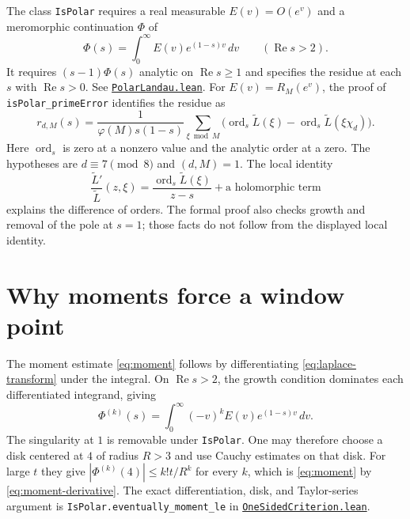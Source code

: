 \documentclass[11pt,oneside,openany]{amsbook}
\theoremstyle{remark}
\numberwithin{equation}{section}
\newcommand{\re}{\operatorname{Re}}
\newcommand{\ghroot}{https://github.com/lsernau/grh-lean/blob/}
\newcommand{\ghrev}{72fead102f663d5c7a407964a13dc0cf9d977207}
\newcommand{\leanfile}[2]{%
  \href{\ghroot\ghrev/grh-compact/src/#1}{\nolinkurl{#2}}}
\begin{document}
The class \texttt{IsPolar} requires a real measurable
$E(v)=O(e^v)$ and a meromorphic continuation $\Phi$ of
\begin{equation}
\label{eq:laplace-transform}
\Phi(s)=\int_0^\infty E(v)e^{(1-s)v}\,dv
\qquad(\re s>2).
\end{equation}
It requires $(s-1)\Phi(s)$ analytic on $\re s\ge1$ and
specifies the residue at each $s$ with $\re s>0$.
See \leanfile{Lib/Analytic/Landau/PolarLandau.lean}%
{PolarLandau.lean}. For $E(v)=R_M(e^v)$, the proof of
\texttt{isPolar\_primeError} identifies the residue as
\begin{equation}
\label{eq:polar-residue}
r_{d,M}(s)=\frac{1}{\varphi(M)s(1-s)}
\sum_{\xi\bmod M}
\bigl(\operatorname{ord}_s\widetilde L(\xi)
  -\operatorname{ord}_s\widetilde L(\xi\chi_d)\bigr).
\end{equation}
Here $\operatorname{ord}_s$ is zero at a nonzero value and
the analytic order at a zero. The hypotheses are
$d\equiv7\pmod8$ and $(d,M)=1$. The local identity
\[
\frac{\widetilde L'}{\widetilde L}(z,\xi)
 =\frac{\operatorname{ord}_s\widetilde L(\xi)}{z-s}
 +\text{a holomorphic term}
\]
explains the difference of orders. The formal proof also
checks growth and removal of the pole at $s=1$; those
facts do not follow from the displayed local identity.

\section{Why moments force a window point}
\label{sec:moment-argument}
The moment estimate \eqref{eq:moment} follows by
differentiating \eqref{eq:laplace-transform} under the
integral. On $\re s>2$, the growth condition dominates
each differentiated integrand, giving
\begin{equation}
\label{eq:moment-derivative}
\Phi^{(k)}(s)=\int_0^\infty
 (-v)^kE(v)e^{(1-s)v}\,dv.
\end{equation}
The singularity at $1$ is removable under \texttt{IsPolar}.
One may therefore choose a disk centered at $4$ of radius
$R>3$ and use Cauchy estimates on that disk. For large
$t$ they give $|\Phi^{(k)}(4)|\le k!t/R^k$ for every $k$,
which is \eqref{eq:moment} by
\eqref{eq:moment-derivative}. The exact differentiation,
disk, and Taylor-series argument is
\texttt{IsPolar.eventually\_moment\_le} in
\leanfile{New/Endgame/OneSidedCriterion.lean}%
{OneSidedCriterion.lean}.
\end{document}
